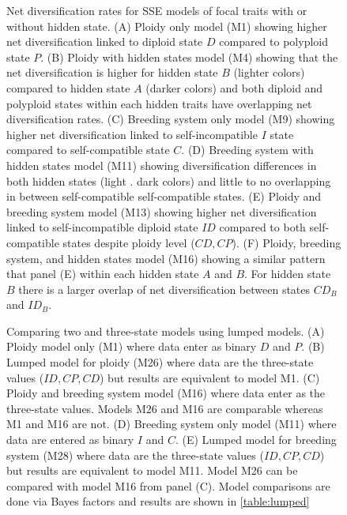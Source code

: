 \begin{figure}
\caption{Net diversification rates for SSE models of focal traits with or without hidden state. 
(A) Ploidy only model (M1) showing higher net diversification linked to diploid state $D$ compared to polyploid state $P$.
(B) Ploidy with hidden states model (M4) showing that the net diversification is higher for hidden state $B$ (lighter colors) compared to hidden state $A$ (darker colors) and both diploid and polyploid states within each hidden traits have overlapping net diversification rates.
(C) Breeding system only model (M9) showing higher net diversification linked to self-incompatible $I$ state compared to self-compatible state $C$.
(D) Breeding system with hidden states model (M11) showing diversification differences in both hidden states (light \vs. dark colors) and little to no overlapping in between self-compatible \vs self-compatible states.
(E) Ploidy and breeding system model (M13) showing higher net diversification linked to self-incompatible diploid state $ID$ compared to both self-compatible states despite ploidy level ($CD, CP$).
(F) Ploidy, breeding system, and hidden states model (M16) showing a similar pattern that panel (E) within each hidden state $A$ and $B$. For hidden state $B$ there is a larger overlap of net diversification between states $CD_B$ and $ID_B$.}
\label{figure:netdivall}
\end{figure}

\begin{figure}
\caption{Comparing two and three-state models using lumped models. (A) Ploidy model only (M1) where data enter as binary $D$ and $P$. 
(B) Lumped model for ploidy (M26) where data are the three-state values ($ID,CP,CD$) but results are equivalent to model M1.  
(C) Ploidy and breeding system model (M16) where  data enter as the three-state values. Models M26 and M16 are comparable whereas M1 and M16 are not.
(D) Breeding system only model (M11) where data are entered as binary $I$ and $C$. 
(E) Lumped model for breeding system (M28) where data are the three-state values ($ID,CP,CD$) but results are equivalent to model M11. Model M26 can be compared with model M16 from panel (C).
Model comparisons are done via Bayes factors and results are shown in \cref{table:lumped}}  
\label{figure:lumped}
\end{figure}

